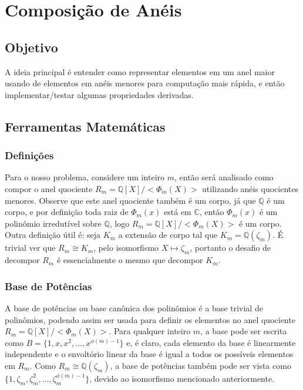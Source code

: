 \section{Composição de Anéis}
\subsection{Objetivo}
A ideia principal é entender como representar elementos em um anel maior usando de elementos em anéis menores para computação mais rápida, e então implementar/testar algumas propriedades derivadas.   

\subsection{Ferramentas Matemáticas}

\subsubsection{Definições}
Para o nosso problema, considere um inteiro $m$, então será analisado como compor o anel quociente $R_{m} = \mathbb{Q}[X]/ <\Phi_{m}(X)>$ utilizando anéis quocientes menores. 
Observe que este anel quociente também é um corpo, já que $\mathbb{Q}$ é um corpo, e por definição toda raiz de $\Phi_m(x)$ está em $\mathbb{C}$, então
$\Phi_m(x)$ é um polinômio irredutível sobre $\mathbb{Q}$, logo $R_{m} = \mathbb{Q}[X]/ <\Phi_{m}(X)>$ é um corpo. Outra definição útil é: seja $K_m$ a extensão de corpo tal que $K_m  = \mathbb{Q}(\zeta_m)$. É trivial ver que  $R_m \cong K_m$, pelo isomorfismo $X \mapsto \zeta_m$, portanto o desafio
de decompor $R_m$ é essencialmente o mesmo que decompor $K_m$.

\subsubsection{Base de Potências}
A base de potências ou base canônica dos polinômios é a base trivial de polinômios, podendo assim ser usada para definir os elementos no anel quociente $R_{m} = \mathbb{Q}[X]/ <\Phi_{m}(X)>$. Para qualquer inteiro $m$, a base pode ser escrita como $B = \{1, x, x^2, ..., x^{\phi(m)-1}\}$ e, é claro, cada elemento da base é linearmente independente e o 
envoltório linear da base é igual a todos os possíveis elementos em $R_{m}$. Como $R_m \cong \mathbb{Q}(\zeta_m)$, a base de potências também pode ser vista como $\{1, \zeta_m, \zeta_m^2, ..., \zeta_m^{\phi(m)-1}\}$, 
devido ao isomorfismo mencionado anteriormente.

